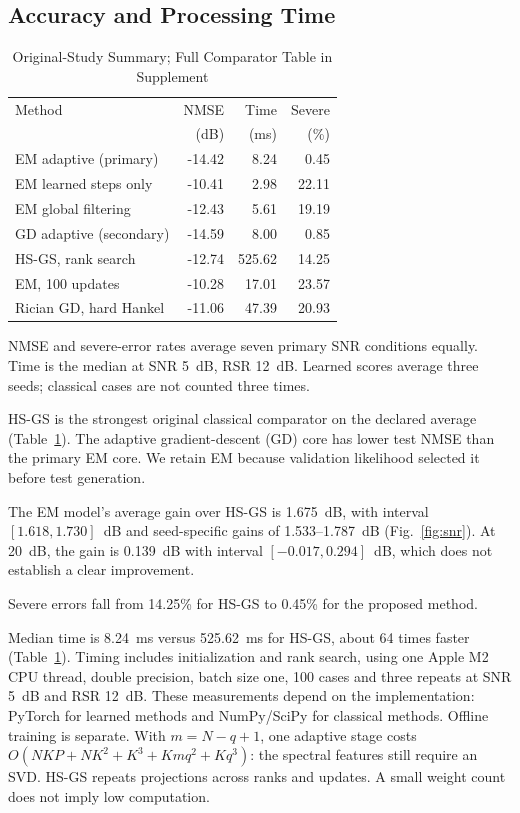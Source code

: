 \documentclass[journal]{IEEEtran}
\begin{document}
\subsection{Accuracy and Processing Time}
\begin{table}[!t]
\caption{Original-Study Summary; Full Comparator Table in Supplement}\label{tab:all}
\centering\footnotesize\setlength{\tabcolsep}{3pt}
\begin{tabular}{@{}lrrr@{}}\toprule
Method & NMSE & Time & Severe\\
 & (dB) & (ms) & (\%)\\\midrule
EM adaptive (primary) & -14.42 & 8.24 & 0.45 \\
EM learned steps only & -10.41 & 2.98 & 22.11 \\
EM global filtering & -12.43 & 5.61 & 19.19 \\
GD adaptive (secondary) & -14.59 & 8.00 & 0.85 \\
HS-GS, rank search & -12.74 & 525.62 & 14.25 \\
EM, 100 updates & -10.28 & 17.01 & 23.57 \\
Rician GD, hard Hankel & -11.06 & 47.39 & 20.93 \\
\bottomrule\end{tabular}
\parbox{\columnwidth}{\footnotesize NMSE and severe-error rates average seven primary SNR conditions equally. Time is the median at SNR 5~dB, RSR 12~dB. Learned scores average three seeds; classical cases are not counted three times.}
\end{table}

HS-GS is the strongest original classical comparator on the declared average
(Table~\ref{tab:all}). The adaptive gradient-descent (GD) core has lower
test NMSE than the primary EM core. We retain EM because validation
likelihood selected it before test generation.

The EM model's average gain over HS-GS is 1.675~dB, with interval
$[1.618,1.730]$~dB and seed-specific gains of 1.533--1.787~dB
(Fig.~\ref{fig:snr}). At 20~dB, the gain is 0.139~dB with interval
$[-0.017,0.294]$~dB, which does not establish a clear improvement.

Severe errors fall from 14.25\% for HS-GS to 0.45\% for the proposed method.

Median time is 8.24~ms versus 525.62~ms for HS-GS, about 64 times faster
(Table~\ref{tab:all}). Timing includes initialization and rank search,
using one Apple M2 CPU thread, double precision, batch size one,
100 cases and three repeats at SNR 5~dB and RSR 12~dB.
These measurements depend on the implementation: PyTorch for learned
methods and NumPy/SciPy for classical methods. Offline training is separate.
With $m=N-q+1$, one adaptive stage costs
$O(NKP+NK^2+K^3+Kmq^2+Kq^3)$: the spectral features still require an SVD.
HS-GS repeats projections across ranks and updates. A small weight count
does not imply low computation.
\end{document}
